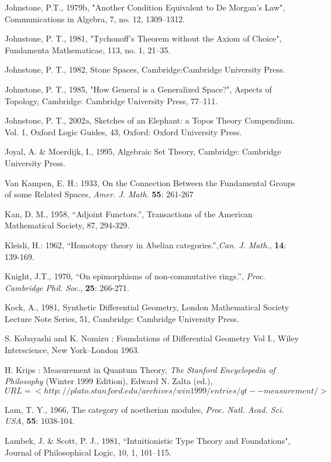\documentclass[12pt]{article}
\theoremstyle{plain}
\theoremstyle{definition}
\numberwithin{equation}{section}
\begin{document}
\begin{thebibliography}{99}
Johnstone, P.T., 1979b, "Another Condition Equivalent to De Morgan's Law", Communications in Algebra, 7, no. 12, 1309--1312.  

Johnstone, P. T., 1981, "Tychonoff's Theorem without the Axiom of Choice", Fundamenta Mathematicae, 113, no. 1, 21--35. 

Johnstone, P. T., 1982, Stone Spaces, Cambridge:Cambridge University Press.  

Johnstone, P. T., 1985, "How General is a Generalized Space?", Aspects of Topology, Cambridge: Cambridge University Press, 77--111. 

Johnstone, P. T., 2002a, Sketches of an Elephant: a Topos Theory Compendium. Vol. 1, Oxford Logic Guides, 43, Oxford: Oxford University Press.  

Joyal, A. \& Moerdijk, I., 1995, Algebraic Set Theory, Cambridge: Cambridge University Press.  

Van Kampen, E. H.: 1933, On the Connection Between the Fundamental
Groups of some Related Spaces, \emph{Amer. J. Math.} \textbf{55}: 261-267

Kan, D. M., 1958, ``Adjoint Functors.'', Transactions of the American Mathematical Society, 87, 294-329.  

Kleisli, H.: 1962, ``Homotopy theory in Abelian categories.'',{\em Can. J. Math.}, \textbf{14}: 139-169.

Knight, J.T., 1970, ``On epimorphisms of non-commutative rings.'', {\em Proc. Cambridge Phil. Soc.},
\textbf{25}: 266-271.

Kock, A., 1981, Synthetic Differential Geometry, London Mathematical Society Lecture Note Series, 51, Cambridge: Cambridge University Press. 

S. Kobayashi and K. Nomizu : Foundations of Differential Geometry
Vol I., Wiley Interscience, New York--London 1963.

H. Krips : Measurement in Quantum Theory, \emph{The Stanford
Encyclopedia of Philosophy } ({Winter 1999 Edition}), Edward N.
Zalta (ed.), $URL=<http://plato.stanford.edu/archives/win1999/entries/qt--measurement/>$

Lam, T. Y., 1966, The category of noetherian modules, {\em Proc. Natl. Acad. Sci. USA}, \textbf{55}: 1038-104.

Lambek, J. \& Scott, P. J., 1981, ``Intuitionistic Type Theory and Foundations", Journal of Philosophical Logic, 10, 1, 101--115. 


\end{thebibliography}
\end{document}
